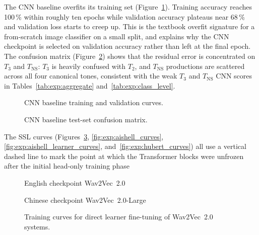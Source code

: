 The CNN baseline overfits its training set
(Figure~\ref{fig:exp:cnn_curve}). Training accuracy reaches 100\,\% within
roughly ten epochs while validation accuracy plateaus near 68\,\% and
validation loss starts to creep up. This is the textbook overfit signature for
a from-scratch image classifier on a small split, and explains why the CNN
checkpoint is selected on validation accuracy rather than left at the final
epoch. The confusion matrix (Figure~\ref{fig:exp:cnn_cm}) shows that the
residual error is concentrated on \(T_3\) and \(T_{\mathrm{NS}}\): \(T_3\) is
heavily confused with \(T_2\), and \(T_{\mathrm{NS}}\) productions are
scattered across all four canonical tones, consistent with the weak \(T_3\)
and \(T_{\mathrm{NS}}\) CNN scores in Tables~\ref{tab:exp:aggregate}
and~\ref{tab:exp:class_level}.

\begin{figure}[H]
\centering
{}
\caption{CNN baseline training and validation curves.}
\label{fig:exp:cnn_curve}
\end{figure}

\begin{figure}[H]
\centering
{}
\caption{CNN baseline test-set confusion matrix.}
\label{fig:exp:cnn_cm}
\end{figure}

The SSL curves
(Figures~\ref{fig:exp:w2v_direct}, \ref{fig:exp:aishell_curves},
\ref{fig:exp:aishell_learner_curves}, and~\ref{fig:exp:hubert_curves}) all use
a vertical dashed line to mark the point at which the Transformer blocks were
unfrozen after the initial head-only training phase

\begin{figure}[H]
\centering
\begin{minipage}{0.49\textwidth}
\centering
{}
\small English checkpoint Wav2Vec~2.0
\end{minipage}
\hfill
\begin{minipage}{0.49\textwidth}
\centering
{}
\small Chinese checkpoint Wav2Vec~2.0-Large
\end{minipage}
\caption{Training curves for direct learner fine-tuning of Wav2Vec~2.0 systems.}
\label{fig:exp:w2v_direct}
\end{figure}

